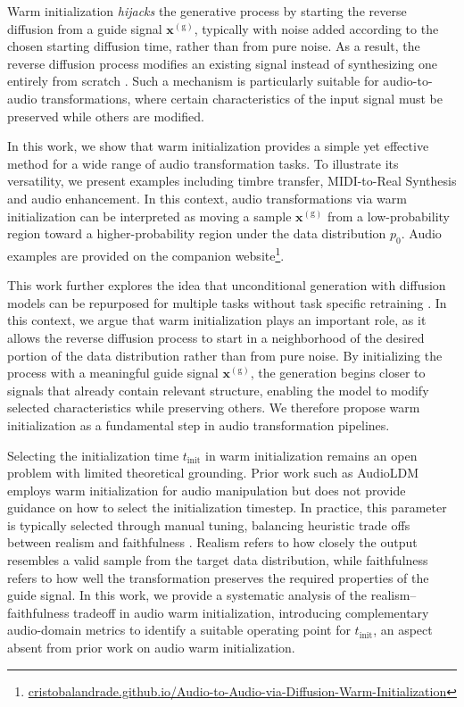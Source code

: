 Warm initialization \textit{hijacks} the generative process by starting the reverse diffusion from a guide signal $\mathbf{x}^{(\mathrm g)}$, typically with noise added according to the chosen starting diffusion time, rather than from pure noise. As a result, the reverse diffusion process modifies an existing signal instead of synthesizing one entirely from scratch \cite{meng2022sdeditguidedimagesynthesis, kawar2023imagic, lee2026diffusiontimbretransfermutual}.
Such a mechanism is particularly suitable for audio-to-audio transformations, where certain characteristics of the input signal must be preserved while others are modified.

In this work, we show that warm initialization provides a simple yet effective method for a wide range of audio transformation tasks. To illustrate its versatility, we present examples including timbre transfer, MIDI-to-Real Synthesis and audio enhancement.  In this context, audio transformations via warm initialization can be interpreted as moving a sample $\mathbf{x}^{(\mathrm g)}$ from a low-probability region toward a higher-probability region under the data distribution $p_0$. Audio examples are provided on the companion website\footnote{\href{https://cristobalandrade.github.io/Audio-to-Audio-via-Diffusion-Warm-Initialization/}{cristobalandrade.github.io/Audio-to-Audio-via-Diffusion-Warm-Initialization}\label{fn:AudioExamples}}.

This work further explores the idea that unconditional generation with diffusion models can be repurposed for multiple tasks without task specific retraining \cite{moliner2023solvingaudioinverseproblems}.   In this context, we argue that warm initialization plays an important role, as it allows the reverse diffusion process to start in a neighborhood of the desired portion of the data distribution rather than from pure noise. By initializing the process with a meaningful guide signal $\mathbf{x}^{(\mathrm g)}$, the generation begins closer to signals that already contain relevant structure, enabling the model to modify selected characteristics while preserving others. We therefore propose warm initialization as a fundamental step in audio transformation pipelines.

Selecting the initialization time $t_\text{init}$ in warm initialization remains an open problem with limited theoretical grounding. Prior work such as AudioLDM \cite{liu2023audioldm} employs warm initialization for audio manipulation but does not provide guidance on how to select the initialization timestep.  In practice, this parameter is typically selected through manual tuning, balancing heuristic trade offs between realism and faithfulness \cite{meng2022sdeditguidedimagesynthesis}. Realism refers to how closely the output resembles a valid sample from the target data distribution, while faithfulness refers to how well the transformation preserves the required properties of the guide signal. In this work, we provide a systematic analysis of the realism–faithfulness tradeoff in audio warm initialization, introducing complementary audio-domain metrics to identify a suitable operating point for $t_\text{init}$, an aspect absent from prior work on audio warm initialization.

